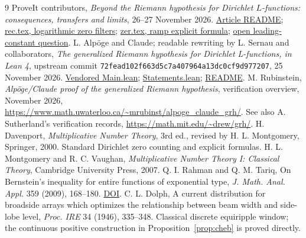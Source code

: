\documentclass[11pt]{article}
\theoremstyle{definition}\newtheorem{definition}[theorem]{Definition}
\newcommand{\repobase}{https://github.com/VladimirReshetnikov/ProveIt/blob/ec99bc9e223fd8ca520792464033914ede28abec/Analysis/GeneralizedRiemannHypothesis}
\begin{document}
\begin{thebibliography}{9}
 ProveIt contributors, \emph{Beyond the Riemann hypothesis for Dirichlet $L$-functions: consequences, transfers and limits}, 26--27 November 2026. \href{\repobase/Article/README.md}{Article README}; \href{\repobase/Article/sections/rec.tex\#L4489-L4616}{rec.tex, logarithmic zero filters}; \href{\repobase/Article/sections/zer.tex\#L1101-L1187}{zer.tex, ramp explicit formula}; \href{\repobase/Article/sections/rec.tex\#L4696-L4698}{open leading-constant question}.
 L. Alp\"oge and Claude; readable rewriting by L. Sernau and collaborators, \emph{The generalized Riemann hypothesis for Dirichlet L-functions, in Lean 4}, upstream commit \texttt{72fead102f663d5c7a407964a13dc0cf9d977207}, 25 November 2026. \href{\repobase/vendor/grh-lean/grh/src/Main.lean}{Vendored Main.lean}; \href{\repobase/vendor/grh-lean/grh/src/Statements.lean}{Statements.lean}; \href{\repobase/vendor/grh-lean/grh/README.md}{README}.
 M. Rubinstein, \emph{Alp\"oge/Claude proof of the generalized Riemann hypothesis}, verification overview, November 2026, \url{https://www.math.uwaterloo.ca/~mrubinst/alpoge_claude_grh/}. See also A. Sutherland's verification records, \url{https://math.mit.edu/~drew/grh/}.
 H. Davenport, \emph{Multiplicative Number Theory}, 3rd ed., revised by H. L. Montgomery, Springer, 2000. Standard Dirichlet zero counting and explicit formulas.
 H. L. Montgomery and R. C. Vaughan, \emph{Multiplicative Number Theory I: Classical Theory}, Cambridge University Press, 2007.
 Q. I. Rahman and Q. M. Tariq, On Bernstein's inequality for entire functions of exponential type, \emph{J. Math. Anal. Appl.} 359 (2009), 168--180. \href{https://doi.org/10.1016/j.jmaa.2009.05.035}{DOI}.
 C. L. Dolph, A current distribution for broadside arrays which optimizes the relationship between beam width and side-lobe level, \emph{Proc. IRE} 34 (1946), 335--348. Classical discrete equiripple window; the continuous positive construction in Proposition~\ref{prop:cheb} is proved directly.
\end{thebibliography}
\end{document}
